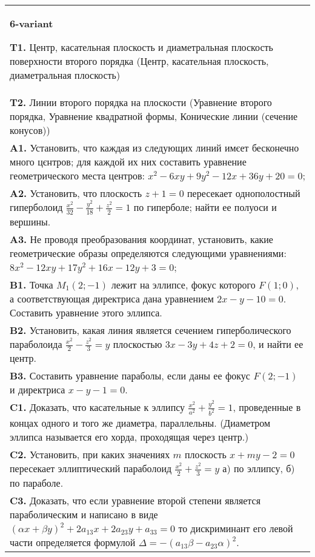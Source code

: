 \documentclass{article}
\begin{document}
\begin{tabular}{m{17cm}}
\textbf{6-variant}
\newline

\textbf{T1.} Центр, касательная плоскость и диаметральная плоскость поверхности второго порядка (Центр, касательная плоскость, диаметральная плоскость) \\
\textbf{T2.} Линии второго порядка на плоскости (Уравнение второго порядка, Уравнение квадратной формы, Конические линии (сечение конусов)) \\
\textbf{A1.} Установить, что каждая из следующих линий имєет бесконечно много цєнтров; для каждой их них составить уравнение геометрического места центров: $x^2-6 x y+9 y^2-12 x+36 y+20=0$; \\
\textbf{A2.} Установить, что плоскость $z+1=0$ пересекает однополостный гиперболоид $\frac{x^2}{32}-\frac{y^2}{18}+\frac{z^2}{2}=1$ по гиперболе; найти ее полуоси и вершины. \\
\textbf{A3.} Не проводя преобразования координат, установить, какие геометрические образы определяются следующими уравнениями: $8 x^2-12 x y+17 y^2+16 x-12 y+3=0$; \\
\textbf{B1.} Точка $M_1(2 ;-1)$ лежит на эллипсе, фокус которого $F(1 ; 0)$, а соответствующая директриса дана уравнением $2 x-y-10=0$. Составить уравнение этого эллипса. \\
\textbf{B2.} Установить, какая линия является сечением гиперболического параболоида $\frac{x^2}{2}-\frac{z^2}{3}=y$ плоскостью $3 x-3 y+4 z+2=0$, и найти ее центр. \\
\textbf{B3.} Составить уравнение параболы, если даны ее фокус $F(2 ;-1)$ и директриса $x-y-1=0$. \\
\textbf{C1.} Доказать, что касательные к эллипсу $\frac{x^2}{a^2}+\frac{y^2}{b^2}=1$, проведенные в концах одного и того же диаметра, параллельны. (Диаметром эллипса называется его хорда, проходящая через центр.) \\
\textbf{C2.} Установить, при каких значениях $m$ плоскость $x+m y-2=0$ пересекает эллиптический параболоид $\frac{x^2}{2}+\frac{z^2}{3}=y$ а) по эллипсу, б) по параболе. \\
\textbf{C3.} Доказать, что если уравнение второй степени является параболическим и написано в виде $ (\alpha x+\beta y) ^2+2a_{13}x+2a_{23}y+a_{33}=0$ то дискриминант его левой части определяется формулой $\Delta=- (a_{13} \beta-a_{23} \alpha) ^2$. \\

\end{tabular}
\vspace{1cm}
\end{document}

